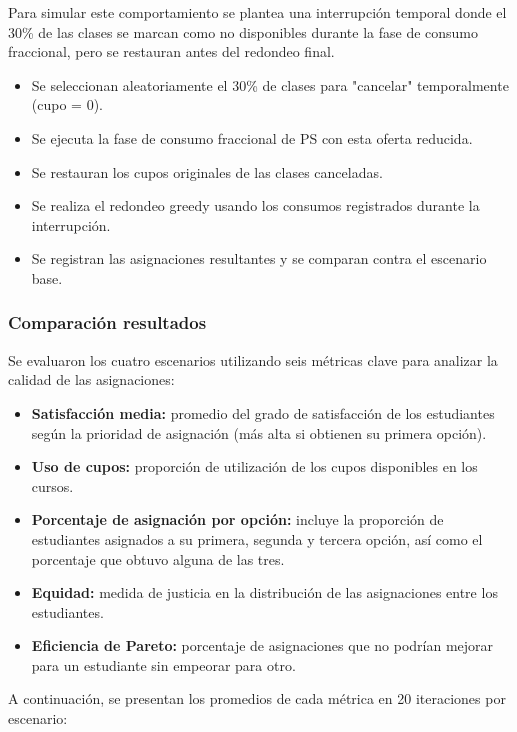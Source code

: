 \documentclass{article}
\begin{document}
Para simular este comportamiento se plantea una interrupción temporal donde el 30\% de las clases se marcan 
como no disponibles durante la fase de consumo fraccional, 
pero se restauran antes del redondeo final. 

\begin{itemize}
\item Se seleccionan aleatoriamente el 30\% de clases para "cancelar" temporalmente (cupo = 0).
\item Se ejecuta la fase de consumo fraccional de PS con esta oferta reducida.
\item Se restauran los cupos originales de las clases canceladas.
\item Se realiza el redondeo greedy usando los consumos registrados durante la interrupción.
\item Se registran las asignaciones resultantes y se comparan contra el escenario base.
\end{itemize}

\subsubsection{Comparación resultados }

Se evaluaron los cuatro escenarios utilizando seis métricas clave para analizar la calidad de las asignaciones:

\begin{itemize}
  \item \textbf{Satisfacción media:} promedio del grado de satisfacción de los estudiantes según la prioridad de asignación (más alta si obtienen su primera opción).
  \item \textbf{Uso de cupos:} proporción de utilización de los cupos disponibles en los cursos.
  \item \textbf{Porcentaje de asignación por opción:} incluye la proporción de estudiantes asignados a su primera, segunda y tercera opción, así como el porcentaje que obtuvo alguna de las tres.
  \item \textbf{Equidad:} medida de justicia en la distribución de las asignaciones entre los estudiantes.
  \item \textbf{Eficiencia de Pareto:} porcentaje de asignaciones que no podrían mejorar para un estudiante sin empeorar para otro.
\end{itemize}

A continuación, se presentan los promedios de cada métrica en 20 iteraciones por escenario:
\end{document}
